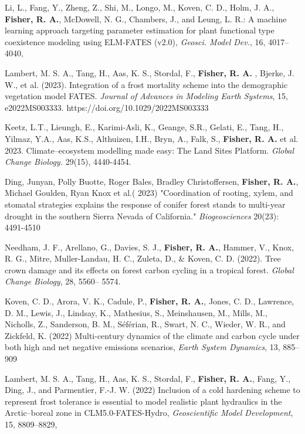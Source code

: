 \documentclass[10pt]{article}
\newenvironment{lonelist}[1][\enskip\textbullet]%
        {\vspace{-\baselineskip}\begin{list}{#1}{%
        \setlength{\itemindent}{-3pt} 
        \setlength{\partopsep}{0pt}%
        \setlength{\leftmargin}{10pt}
        \setlength{\topsep}{15pt}}}
        {\end{list}\vspace{-.3\baselineskip}}
\begin{document}
\begin{lonelist}
\item[79] Li, L., Fang, Y., Zheng, Z., Shi, M., Longo, M., Koven, C. D., Holm, J. A., \textbf{Fisher, R. A.}, McDowell, N. G., Chambers, J., and Leung, L. R.: A machine learning approach targeting parameter estimation for plant functional type coexistence modeling using ELM-FATES (v2.0), \emph{Geosci. Model Dev.}, 16, 4017–4040, 

\item[78]  Lambert, M. S. A., Tang, H., Aas, K. S., Stordal, F., \textbf{Fisher, R. A.} , Bjerke, J. W., et al. (2023). Integration of a frost mortality scheme into the demographic vegetation model FATES. \emph{Journal of Advances in Modeling Earth Systems}, 15, e2022MS003333. https://doi.org/10.1029/2022MS003333

 \item[77]  Keetz, L.T., Lieungh, E., Karimi‐Asli, K., Geange, S.R., Gelati, E., Tang, H., Yilmaz, Y.A., Aas, K.S., Althuizen, I.H., Bryn, A., Falk, S., \textbf{Fisher, R. A.} et al. 2023. Climate–ecosystem modelling made easy: The Land Sites Platform. \emph{Global Change Biology.} 29(15), 4440-4454.

\item[76]  Ding, Junyan, Polly Buotte, Roger Bales, Bradley Christoffersen,  \textbf{Fisher, R. A.}, Michael Goulden, Ryan Knox et al.( 2023) "Coordination of rooting, xylem, and stomatal strategies explains the response of conifer forest stands to multi-year drought in the southern Sierra Nevada of California."  \emph{Biogeosciences} 20(23): 4491-4510

\item[75] Needham, J. F., Arellano, G., Davies, S. J., \textbf{Fisher, R. A.},  Hammer, V., Knox, R. G., Mitre, Muller-Landau, H. C., Zuleta, D., \& Koven, C. D. (2022). Tree crown damage and its effects on forest carbon cycling in a tropical forest. \emph{Global Change Biology}, 28, 5560– 5574. 

\item[74] Koven, C. D., Arora, V. K., Cadule, P., \textbf{Fisher, R. A.}, Jones, C. D., Lawrence, D. M., Lewis, J., Lindsay, K., Mathesius, S., Meinshausen, M., Mills, M., Nicholls, Z., Sanderson, B. M., Séférian, R., Swart, N. C., Wieder, W. R., and Zickfeld, K. (2022) Multi-century dynamics of the climate and carbon cycle under both high and net negative emissions scenarios, \emph{Earth System Dynamics}, 13, 885–909

\item[73] Lambert, M. S. A., Tang, H., Aas, K. S., Stordal, F., \textbf{Fisher, R. A.}, Fang, Y., Ding, J., and Parmentier, F.-J. W. (2022) Inclusion of a cold hardening scheme to represent frost tolerance is essential to model realistic plant hydraulics in the Arctic–boreal zone in CLM5.0-FATES-Hydro, \emph{Geoscientific Model Development}, 15, 8809–8829,


\end{lonelist}
\end{document}
